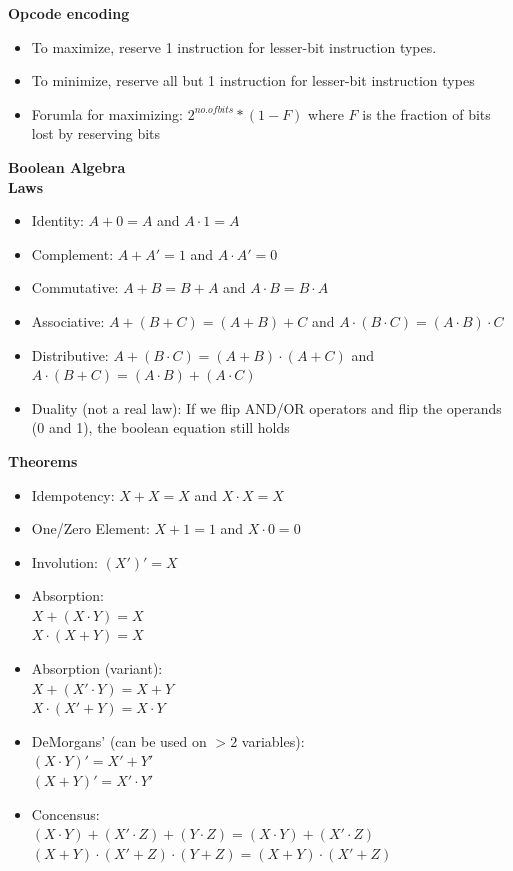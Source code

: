 \documentclass[a4paper]{article} \usepackage[backend=biber, style=numeric, sorting=none]{biblatex}
\begin{document}
\begin{multicols*}{4}
\textbf{Opcode encoding}
\begin{itemize}[leftmargin=*]
\itemsep -0.5em
\item To maximize, reserve 1 instruction for lesser-bit instruction types.
\item To minimize, reserve all but 1 instruction for lesser-bit instruction types
\item Forumla for maximizing: $2^{no. of bits} * (1 - F)$ where $F$ is the fraction of bits lost by reserving bits
\end{itemize}

{\small\textbf{Boolean Algebra}}
\\ \textbf{Laws}
\begin{itemize}[leftmargin=*]
\itemsep -0.5em
\item Identity: $A + 0 = A$ and $A \cdot 1 = A$
\item Complement: $A + A' = 1$ and $A \cdot A' = 0$
\item Commutative: $A + B = B + A$  and $A \cdot B = B \cdot A$
\item Associative: $A + (B + C) = (A + B) + C$ and $A \cdot (B \cdot C) = (A \cdot B) \cdot C$
\item Distributive: $A + (B \cdot C) = (A + B) \cdot (A + C)$ and $A \cdot (B + C) = (A \cdot B) + (A \cdot C)$
\item Duality (not a real law): If we flip AND/OR operators and flip the operands (0 and 1), the boolean equation still holds
\end{itemize}

\textbf{Theorems}
\begin{itemize}[leftmargin=*]
\itemsep -0.5em
\item Idempotency: $X + X = X$ and $X \cdot X = X$
\item One/Zero Element: $X + 1 = 1$ and $X \cdot 0 = 0$
\item Involution: $(X')' = X$ 
\item Absorption: \\ $X + (X \cdot Y) = X$ \\ $X \cdot (X + Y) = X$
\item Absorption (variant): \\ $X + (X' \cdot Y) = X + Y$ \\ $X \cdot (X' + Y) = X \cdot Y$
\item DeMorgans' (can be used on $>2$ variables): \\ $(X \cdot Y)' = X' + Y'$ \\ $(X + Y)' = X' \cdot Y'$
\item Concensus: \\ $(X \cdot Y) + (X' \cdot Z) + (Y \cdot Z) = (X \cdot Y) + (X' \cdot Z)$ \\ $(X + Y) \cdot (X' + Z) \cdot (Y + Z) = (X + Y) \cdot (X' + Z)$
\end{itemize}


\end{multicols*}
\end{document}
